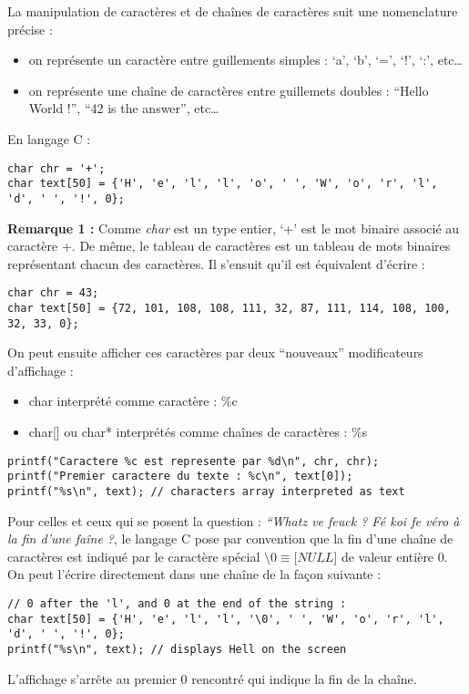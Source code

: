\documentclass[../../../main.tex]{subfiles}
\begin{document}
La manipulation de caractères et de chaînes de caractères suit une nomenclature précise :
\begin{itemize}
	\item on représente un caractère entre guillements simples : `a', `b', `=', `!', `:', etc\dots
	\item on représente une chaîne de caractères entre guillemets doubles : ``Hello World !'', ``42 is the answer'', etc\dots
\end{itemize}
En langage C :
\begin{verbatim}
char chr = '+';
char text[50] = {'H', 'e', 'l', 'l', 'o', ' ', 'W', 'o', 'r', 'l', 'd', ' ', '!', 0};
\end{verbatim}
\textbf{Remarque 1 :} Comme \textit{char} est un type entier, `+' est le mot binaire associé au caractère +. De même, le tableau de caractères est un tableau de mots binaires représentant chacun des caractères. Il s'ensuit qu'il est équivalent d'écrire :
\begin{verbatim}
char chr = 43;
char text[50] = {72, 101, 108, 108, 111, 32, 87, 111, 114, 108, 100, 32, 33, 0};
\end{verbatim}
On peut ensuite afficher ces caractères par deux ``nouveaux'' modificateurs d'affichage : 
\begin{itemize}
	\item \textsf{char} interprété comme caractère : \textsf{\%c}
	\item \textsf{char[]} ou \textsf{char*} interprétés comme chaînes de caractères : \textsf{\%s}
\end{itemize}
\begin{verbatim}
printf("Caractere %c est represente par %d\n", chr, chr);
printf("Premier caractere du texte : %c\n", text[0]);
printf("%s\n", text); // characters array interpreted as text
\end{verbatim}
Pour celles et ceux qui se posent la question : \textit{``Whatz ve feuck ? Fé koi fe véro à la fin d'une faîne ?}, le langage C pose par convention que la fin d'une chaîne de caractères est indiqué par le caractère spécial $\setminus0\equiv\textit{[NULL]}$ de valeur entière 0. On peut l'écrire directement dans une chaîne de la façon suivante :
\begin{verbatim}
// 0 after the 'l', and 0 at the end of the string :
char text[50] = {'H', 'e', 'l', 'l', '\0', ' ', 'W', 'o', 'r', 'l', 'd', ' ', '!', 0};
printf("%s\n", text); // displays Hell on the screen
\end{verbatim}
L'affichage s'arrête au premier 0 rencontré qui indique la fin de la chaîne.
 
\end{document}
